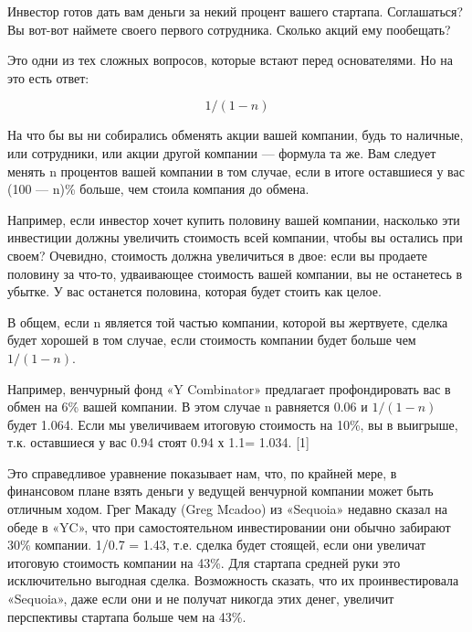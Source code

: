 \documentclass[ebook,12pt,oneside,openany]{memoir}
\date{}
\begin{document}
\maketitle

Инвестор готов дать вам деньги за некий процент вашего стартапа.
Соглашаться? Вы вот-вот наймете своего первого сотрудника. Сколько
акций ему пообещать? \newline

Это одни из тех сложных вопросов, которые встают перед основателями.
Но на это есть ответ:

\[
1/(1 - n)
\]

На что бы вы ни собирались обменять акции вашей компании, будь то
наличные, или сотрудники, или акции другой компании — формула та же.
Вам следует менять n процентов вашей компании в том случае, если в
итоге оставшиеся у вас (100 — n)\% больше, чем стоила компания до
обмена. \newline

Например, если инвестор хочет купить половину вашей компании,
насколько эти инвестиции должны увеличить стоимость всей компании,
чтобы вы остались при своем? Очевидно, стоимость должна увеличиться в
двое: если вы продаете половину за что-то, удваивающее стоимость вашей
компании, вы не останетесь в убытке. У вас останется половина, которая
будет стоить как целое. \newline

В общем, если n является той частью компании, которой вы жертвуете,
сделка будет хорошей в том случае, если стоимость компании будет
больше чем $1/(1 - n)$. \newline

Например, венчурный фонд «Y Combinator» предлагает профондировать вас
в обмен на 6\% вашей компании. В этом случае n равняется 0.06 и $1/(1 -
n)$ будет 1.064. Если мы увеличиваем итоговую стоимость на 10\%, вы в
выигрыше, т.к. оставшиеся у вас 0.94 стоят 0.94 х 1.1= 1.034. [1] \newline

Это справедливое уравнение показывает нам, что, по крайней мере, в
финансовом плане взять деньги у ведущей венчурной компании может быть
отличным ходом. Грег Макаду (Greg Mcadoo) из «Sequoia» недавно сказал
на обеде в «YC», что при самостоятельном инвестировании они обычно
забирают 30\% компании. 1/0.7 = 1.43, т.е. сделка будет стоящей, если
они увеличат итоговую стоимость компании на 43\%. Для стартапа средней
руки это исключительно выгодная сделка. Возможность сказать, что их
проинвестировала «Sequoia», даже если они и не получат никогда этих
денег, увеличит перспективы стартапа больше чем на 43\%. \newline
\end{document}
